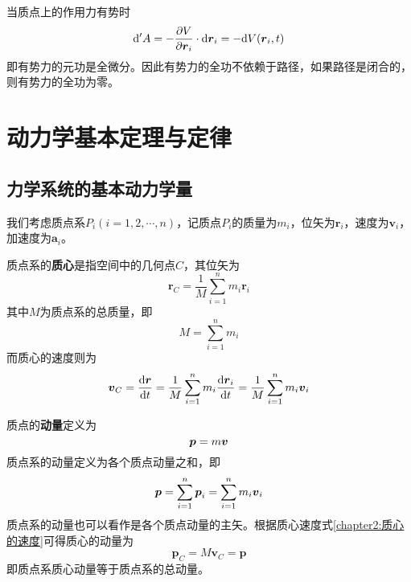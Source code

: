 当质点上的作用力有势时
\begin{equation}
	\mathrm{d}'A = -\frac{\partial V}{\partial \boldsymbol{r}_i} \cdot \mathrm{d}\boldsymbol{r}_i = -\mathrm{d} V(\boldsymbol{r}_i,t)
\end{equation}
即有势力的元功是全微分。因此有势力的全功不依赖于路径，如果路径是闭合的，则有势力的全功为零。


\section{动力学基本定理与定律}

\subsection{力学系统的基本动力学量}

我们考虑质点系$P_i(i=1,2,\cdots,n)$，记质点$P_i$的质量为$m_i$，位矢为$\boldsymbol{r}_i$，速度为$\boldsymbol{v}_i$，加速度为$\boldsymbol{a}_i$。

质点系的{\bf 质心}是指空间中的几何点$C$，其位矢为
\begin{equation}
	\boldsymbol{r}_C = \frac{1}{M}\sum_{i=1}^nm_i\boldsymbol{r}_i
\end{equation}
其中$M$为质点系的总质量，即
\begin{equation}
	M = \sum_{i=1}^nm_i
\end{equation}
而质心的速度则为
\begin{equation}
	\boldsymbol{v}_C = \frac{\mathrm{d}\boldsymbol{r}}{\mathrm{d} t} = \frac{1}{M}\sum_{i=1}^nm_i\frac{\mathrm{d}\boldsymbol{r}_i}{\mathrm{d} t} = \frac{1}{M}\sum_{i=1}^nm_i\boldsymbol{v}_i
	\label{chapter2:质心的速度}
\end{equation}

质点的{\bf 动量}定义为
\begin{equation}
	\boldsymbol{p} = m\boldsymbol{v}
\end{equation}
质点系的动量定义为各个质点动量之和，即
\begin{equation}
	\boldsymbol{p} = \sum_{i=1}^n \boldsymbol{p}_i = \sum_{i=1}^nm_i\boldsymbol{v}_i
\end{equation}
质点系的动量也可以看作是各个质点动量的主矢。根据质心速度式\eqref{chapter2:质心的速度}可得质心的动量为
\begin{equation}
	\boldsymbol{p}_C = M\boldsymbol{v}_C = \boldsymbol{p}
	\label{chapter2:质心动量表达式}
\end{equation}
即质点系质心动量等于质点系的总动量。

